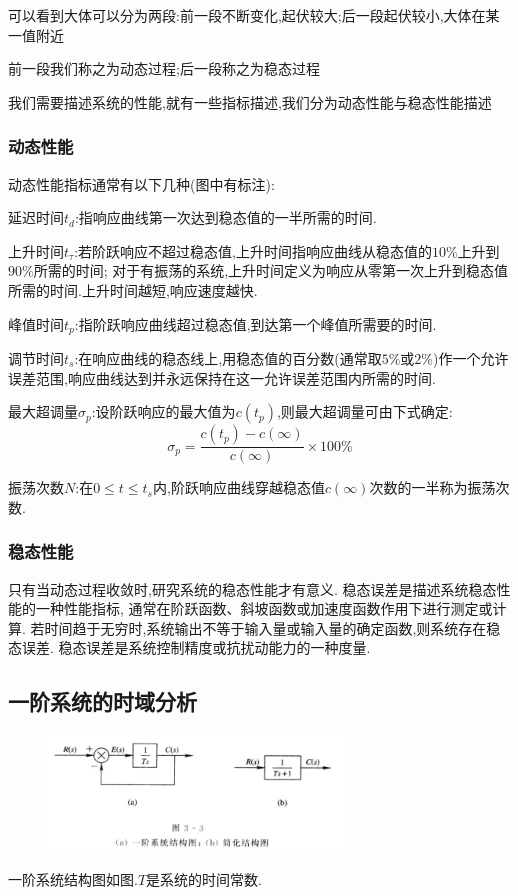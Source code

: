 \documentclass[12pt,a4paper,oneside]{ctexart}
\begin{document}
可以看到大体可以分为两段:前一段不断变化,起伏较大;后一段起伏较小,大体在某一值附近

前一段我们称之为动态过程;后一段称之为稳态过程

我们需要描述系统的性能,就有一些指标描述,我们分为动态性能与稳态性能描述

\subsubsection{动态性能}
动态性能指标通常有以下几种(图中有标注):

延迟时间$t_d$:指响应曲线第一次达到稳态值的一半所需的时间.

上升时间$t_{\tau}$:若阶跃响应不超过稳态值,上升时间指响应曲线从稳态值的$10\%$上升到$90\%$所需的时间;
对于有振荡的系统,上升时间定义为响应从零第一次上升到稳态值所需的时间.上升时间越短,响应速度越快.

峰值时间$t_p$:指阶跃响应曲线超过稳态值,到达第一个峰值所需要的时间.

调节时间$t_s$:在响应曲线的稳态线上,用稳态值的百分数(通常取$5\%$或$2\%$)作一个允许误差范围,响应曲线达到并永远保持在这一允许误差范围内所需的时间.

最大超调量$\sigma_p$:设阶跃响应的最大值为$c(t_p)$,则最大超调量可由下式确定:
\[
    \sigma_p = \frac{c(t_p)-c(\infty)}{c(\infty)} \times 100 \%
\]

振荡次数$N$:在$0\leqslant t\leqslant t_s$内,阶跃响应曲线穿越稳态值$c(\infty)$次数的一半称为振荡次数.

\subsubsection{稳态性能}
只有当动态过程收敛时,研究系统的稳态性能才有意义.
稳态误差是描述系统稳态性能的一种性能指标,
通常在阶跃函数、斜坡函数或加速度函数作用下进行测定或计算.
若时间趋于无穷时,系统输出不等于输入量或输入量的确定函数,则系统存在稳态误差.
稳态误差是系统控制精度或抗扰动能力的一种度量.

\subsection{一阶系统的时域分析}
\begin{figure}[H]
    \centering
    \includegraphics[width=8cm]{photos/一阶系统结构图.png}
\end{figure}
一阶系统结构图如图.$T$是系统的时间常数.
\end{document}
